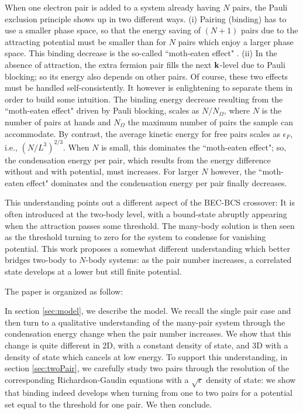 \documentclass[5p,twocolumn]{elsarticle}
\begin{document}
When one electron pair is added to a system already having $N$ pairs, the Pauli exclusion principle shows up in two different ways.  (i) Pairing (binding) has to use a smaller phase space, so that the energy saving of $(N+1)$ pairs due to the attracting potential must be smaller than for $N$ pairs which enjoy a larger phase space.  This binding decrease is the so-called ``moth-eaten effect" \cite{moth}. (ii) In the absence of attraction, the extra fermion pair fills the next $\mathbf{k}$-level due to Pauli blocking; so its energy also depends on other pairs.  Of course, these two effects must be handled self-consistently. It however is enlightening to separate them in order to build some intuition. The binding energy decrease resulting from the ``moth-eaten effect" driven by Pauli blocking, scales as $N/N_\Omega$, where $N$ is the number of pairs at hands and $N_\Omega$ the maximum number of pairs the sample can accommodate. By contrast, 
the average kinetic energy for free pairs scales as $\epsilon_F$, i.e., $(N/L^3)^{2/3}$. 
When $N$ is small, this dominates the ``moth-eaten effect"; so, the condensation energy per pair, which results from the energy difference without and with potential, must increases.  For larger $N$ however, the ``moth-eaten effect" dominates and the condensation energy per pair finally decreases.

This understanding points out a different aspect of the BEC-BCS crossover:  It is often introduced at the two-body level, with a bound-state abruptly appearing when the attraction passes some threshold. The many-body solution is then seen as the threshold turning to zero for the system to condense for vanishing potential. This work proposes a somewhat different understanding which better bridges two-body to $N$-body systems: as the pair number increases, a correlated state develops at a lower but still finite potential.

The paper is organized as follow:

In section \ref{sec:model}, we describe the model. We recall the single pair case and then turn to a qualitative understanding of the many-pair system through the condensation energy change when the pair number increases. We show that this change is quite different in 2D, with a constant density of state, and 3D  with a density of state which cancels at low energy.  To support this understanding, in section \ref{sec:twoPair}, we carefully study two pairs through the resolution of the corresponding  Richardson-Gaudin equations with a $\sqrt{\epsilon}$ density of state: we show that  binding indeed develops when turning from one to two pairs for a potential set equal to the threshold for one pair. We then conclude.
\end{document}

